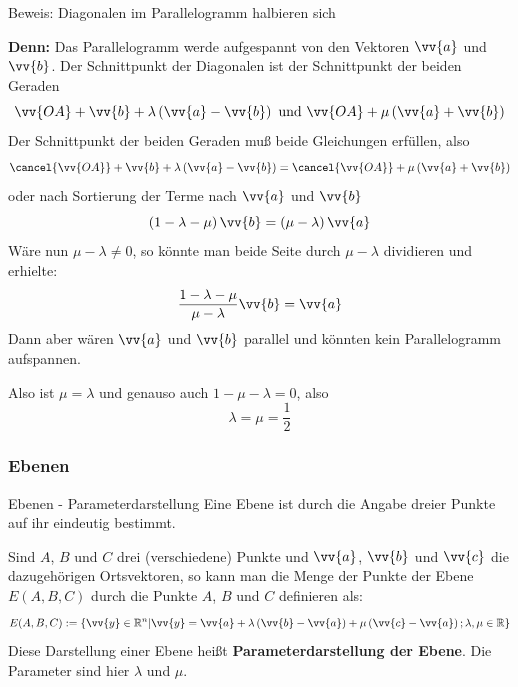 \begin{frame}{Beweis: Diagonalen im Parallelogramm halbieren sich}
		\begin{scriptsize}

		\textbf{Denn:} Das Parallelogramm werde aufgespannt von den Vektoren $\vv{a}$ und $\vv{b}$.
		Der Schnittpunkt der Diagonalen ist der Schnittpunkt der beiden Geraden
		\[
		\vv{OA} + \vv{b} + \lambda \left(\vv{a} - \vv{b}\right) \mbox{ und } 	\vv{OA} + \mu \left(\vv{a} + \vv{b}\right)
		\]
		Der Schnittpunkt der beiden Geraden muß  beide Gleichungen erfüllen, also
		\[
		\cancel{\vv{OA}} + \vv{b} + \lambda \left(\vv{a} - \vv{b}\right) =	\cancel{\vv{OA}} + \mu \left(\vv{a} + \vv{b}\right)
		\]
		oder nach Sortierung der Terme nach $\vv{a}$ und $\vv{b}$ \[
		\left(1-\lambda-\mu\right) \vv{b} = \left(\mu - \lambda \right) \vv{a}
		\]
		Wäre nun $\mu - \lambda \neq 0$, so könnte man beide Seite durch $\mu - \lambda$ dividieren und erhielte:
		\[
		\frac{1 - \lambda - \mu}{\mu - \lambda} \vv{b} = \vv{a}
		\]
		Dann aber wären $\vv{a}$ und $\vv{b}$ parallel und könnten kein Parallelogramm aufspannen.
		
		Also ist $\mu = \lambda$ und genauso auch $1 - \mu - \lambda = 0$, also
		\[
		\lambda = \mu = \frac{1}{2}
		\]
		\end{scriptsize}
\end{frame}

\subsubsection{Ebenen}

\begin{frame}{Ebenen - Parameterdarstellung}
	Eine Ebene ist durch die Angabe dreier Punkte auf ihr eindeutig bestimmt.
	
	Sind $A$, $B$ und $C$ drei (verschiedene) Punkte und $\vv{a}$, $\vv{b}$ und $\vv{c}$ die dazugehörigen Ortsvektoren, so kann man die Menge der Punkte der Ebene $E(A,B,C)$ durch die Punkte $A$, $B$ und $C$ definieren als:
	\[
		E(A,B,C) := \left\{ \vv{y} \in \mathbb{R}^n \middle| \vv{y} = \vv{a} + \lambda \left(\vv{b} - \vv{a} \right) + \mu \left(\vv{c} - \vv{a} \right); \lambda, \mu \in \mathbb{R} \right\}
	\]
	Diese Darstellung einer Ebene heißt \textbf{Parameterdarstellung der Ebene}. Die Parameter sind hier $\lambda$ und $\mu$.
\end{frame}

